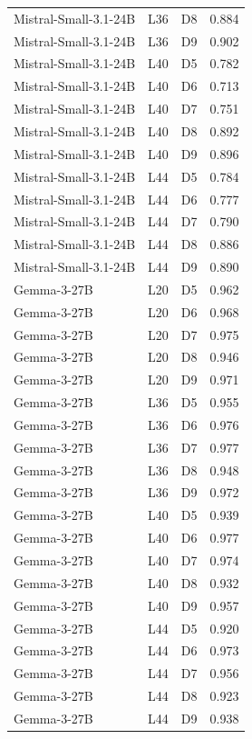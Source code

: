 \begin{table}
\begin{tabular}{lllr}
Mistral-Small-3.1-24B & L36 & D8 & 0.884 \\
Mistral-Small-3.1-24B & L36 & D9 & 0.902 \\
Mistral-Small-3.1-24B & L40 & D5 & 0.782 \\
Mistral-Small-3.1-24B & L40 & D6 & 0.713 \\
Mistral-Small-3.1-24B & L40 & D7 & 0.751 \\
Mistral-Small-3.1-24B & L40 & D8 & 0.892 \\
Mistral-Small-3.1-24B & L40 & D9 & 0.896 \\
Mistral-Small-3.1-24B & L44 & D5 & 0.784 \\
Mistral-Small-3.1-24B & L44 & D6 & 0.777 \\
Mistral-Small-3.1-24B & L44 & D7 & 0.790 \\
Mistral-Small-3.1-24B & L44 & D8 & 0.886 \\
Mistral-Small-3.1-24B & L44 & D9 & 0.890 \\
Gemma-3-27B & L20 & D5 & 0.962 \\
Gemma-3-27B & L20 & D6 & 0.968 \\
Gemma-3-27B & L20 & D7 & 0.975 \\
Gemma-3-27B & L20 & D8 & 0.946 \\
Gemma-3-27B & L20 & D9 & 0.971 \\
Gemma-3-27B & L36 & D5 & 0.955 \\
Gemma-3-27B & L36 & D6 & 0.976 \\
Gemma-3-27B & L36 & D7 & 0.977 \\
Gemma-3-27B & L36 & D8 & 0.948 \\
Gemma-3-27B & L36 & D9 & 0.972 \\
Gemma-3-27B & L40 & D5 & 0.939 \\
Gemma-3-27B & L40 & D6 & 0.977 \\
Gemma-3-27B & L40 & D7 & 0.974 \\
Gemma-3-27B & L40 & D8 & 0.932 \\
Gemma-3-27B & L40 & D9 & 0.957 \\
Gemma-3-27B & L44 & D5 & 0.920 \\
Gemma-3-27B & L44 & D6 & 0.973 \\
Gemma-3-27B & L44 & D7 & 0.956 \\
Gemma-3-27B & L44 & D8 & 0.923 \\
Gemma-3-27B & L44 & D9 & 0.938 \\
\bottomrule
\end{tabular}
\end{table}
